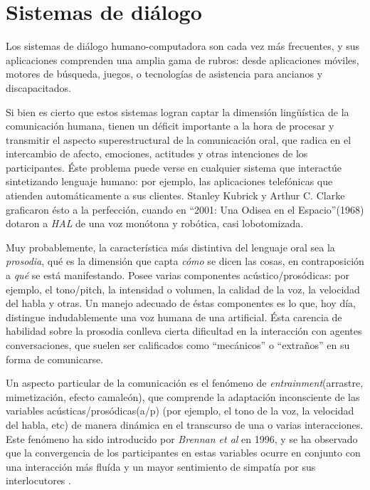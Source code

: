 \section{Sistemas de diálogo}

Los sistemas de diálogo humano-computadora son cada vez más frecuentes, y sus aplicaciones comprenden una amplia gama de rubros: desde aplicaciones móviles, motores de búsqueda, juegos, o tecnologías de asistencia para ancianos y discapacitados.


Si bien es cierto que estos sistemas logran captar la dimensión lingüística de la comunicación humana, tienen un déficit importante a la hora de procesar y transmitir el aspecto superestructural de la comunicación oral, que radica en el intercambio de afecto, emociones, actitudes y otras intenciones de los participantes. Éste problema puede verse en cualquier sistema que interactúe sintetizando lenguaje humano: por ejemplo, las aplicaciones telefónicas que atienden automáticamente a sus clientes. Stanley Kubrick y Arthur C. Clarke graficaron ésto a la perfección, cuando en ``2001: Una Odisea en el Espacio''(1968) dotaron a \emph{HAL} de una voz monótona y robótica, casi lobotomizada.

Muy probablemente, la característica más distintiva del lenguaje oral sea la \emph{prosodia}, qué es la dimensión que capta \emph{cómo} se dicen las cosas, en contraposición a \emph{qué} se está manifestando. Posee varias componentes acústico/prosódicas: por ejemplo, el tono/pitch, la intensidad o volumen, la calidad de la voz, la velocidad del habla y otras. Un manejo adecuado de éstas componentes es lo que, hoy día, distingue indudablemente una voz humana de una artificial. Ésta carencia de habilidad sobre la prosodia conlleva cierta dificultad en la interacción con agentes conversaciones, que suelen ser calificados como ``mecánicos'' o ``extraños'' en su forma de comunicarse.


Un aspecto particular de la comunicación es el fenómeno de \emph{entrainment}(arrastre, mimetización, efecto camaleón), que comprende la adaptación inconsciente de las variables acústicas/prosódicas(a/p) (por ejemplo, el tono de la voz, la velocidad del habla, etc) de manera dinámica en el transcurso de una o varias interacciones. Este fenómeno ha sido introducido por \emph{Brennan et al}\cite{BRE1996} en 1996, y se ha observado que la convergencia de los participantes en estas variables ocurre en conjunto con una interacción más fluída y un mayor sentimiento de simpatía por sus interlocutores \cite{CHAR1999}.

